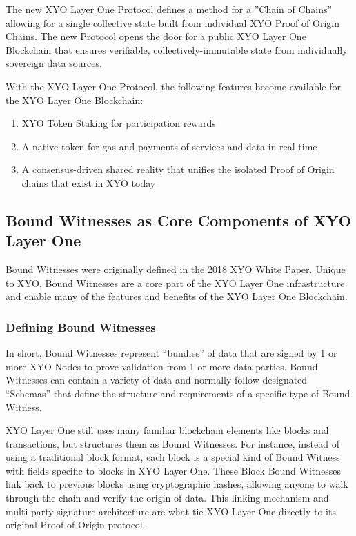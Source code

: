 \documentclass{article}
\begin{document}
The new XYO Layer One Protocol defines a method for a ”Chain of Chains”
allowing for a single collective state built from individual XYO Proof of
Origin Chains. The new Protocol opens the door for a public XYO Layer One
Blockchain that ensures verifiable, collectively-immutable state from
individually sovereign data sources.

With the XYO Layer One Protocol, the following features become available for
the XYO Layer One Blockchain:

\begin{enumerate}
    \item XYO Token Staking for participation rewards
    \item A native token for gas and payments of services and data in real time
    \item A consensus-driven shared reality that unifies the isolated Proof of Origin
          chains that exist in XYO today
\end{enumerate}

\subsection{Bound Witnesses as Core Components of XYO Layer One}
Bound Witnesses were originally defined in the 2018 XYO White Paper. Unique to
XYO, Bound Witnesses are a core part of the XYO Layer One infrastructure and
enable many of the features and benefits of the XYO Layer One Blockchain.

\subsubsection{Defining Bound Witnesses}
In short, Bound Witnesses represent “bundles” of data that are signed by 1 or
more XYO Nodes to prove validation from 1 or more data parties. Bound Witnesses
can contain a variety of data and normally follow designated “Schemas” that
define the structure and requirements of a specific type of Bound Witness.

XYO Layer One still uses many familiar blockchain elements like blocks and
transactions, but structures them as Bound Witnesses. For instance, instead of
using a traditional block format, each block is a special kind of Bound Witness
with fields specific to blocks in XYO Layer One. These Block Bound Witnesses
link back to previous blocks using cryptographic hashes, allowing anyone to
walk through the chain and verify the origin of data. This linking mechanism
and multi-party signature architecture are what tie XYO Layer One directly to
its original Proof of Origin protocol.
\end{document}
